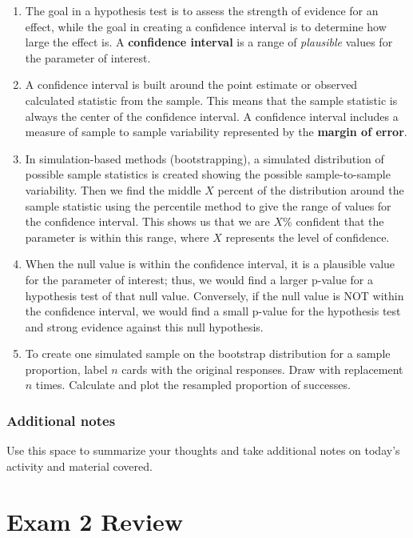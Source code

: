 \documentclass[
]{report}
\begin{document}
\begin{enumerate}
\def\labelenumi{\arabic{enumi}.}
\item
  The goal in a hypothesis test is to assess the strength of evidence for an effect, while the goal in creating a confidence interval is to determine how large the effect is. A \textbf{confidence interval} is a range of \emph{plausible} values for the parameter of interest.
\item
  A confidence interval is built around the point estimate or observed calculated statistic from the sample. This means that the sample statistic is always the center of the confidence interval. A confidence interval includes a measure of sample to sample variability represented by the \textbf{margin of error}.
\item
  In simulation-based methods (bootstrapping), a simulated distribution of possible sample statistics is created showing the possible sample-to-sample variability. Then we find the middle \(X\) percent of the distribution around the sample statistic using the percentile method to give the range of values for the confidence interval. This shows us that we are \(X\)\% confident that the parameter is within this range, where \(X\) represents the level of confidence.
\item
  When the null value is within the confidence interval, it is a plausible value for the parameter of interest; thus, we would find a larger p-value for a hypothesis test of that null value. Conversely, if the null value is NOT within the confidence interval, we would find a small p-value for the hypothesis test and strong evidence against this null hypothesis.
\item
  To create one simulated sample on the bootstrap distribution for a sample proportion, label \(n\) cards with the original responses. Draw with replacement \(n\) times. Calculate and plot the resampled proportion of successes.
\end{enumerate}

\hypertarget{additional-notes-2}{%
\subsection{Additional notes}\label{additional-notes-2}}

Use this space to summarize your thoughts and take additional notes on today's activity and material covered.

\newpage

\hypertarget{exam-2-review}{%
\chapter{Exam 2 Review}\label{exam-2-review}}
\end{document}
